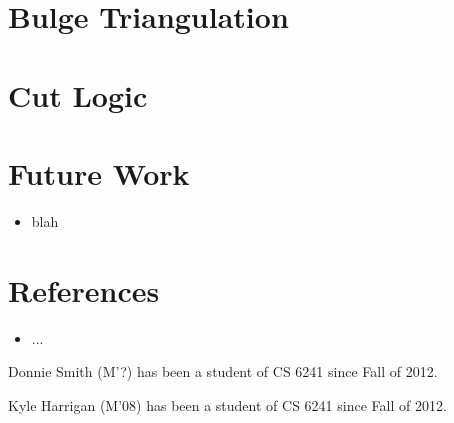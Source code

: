 \documentclass[letterpaper,10pt]{IEEEtran}
\begin{document}
\section{Bulge Triangulation}

\section{Cut Logic}

 \section{Future Work}
  \begin{multicols}{2}
 \begin{itemize}
\item blah
\end{itemize}
\end{multicols} 
\section{References}
\begin{itemize}
\itemsep0em
\item ...
\end{itemize}

\begin{IEEEbiography}{Donnie Smith} 
(M'?)  has been a student of CS 6241 since Fall of 2012.  
\end{IEEEbiography}

\begin{IEEEbiography}{Kyle Harrigan} 
(M'08) has been a student of CS 6241 since Fall of 2012.  
\end{IEEEbiography}
\end{document}
